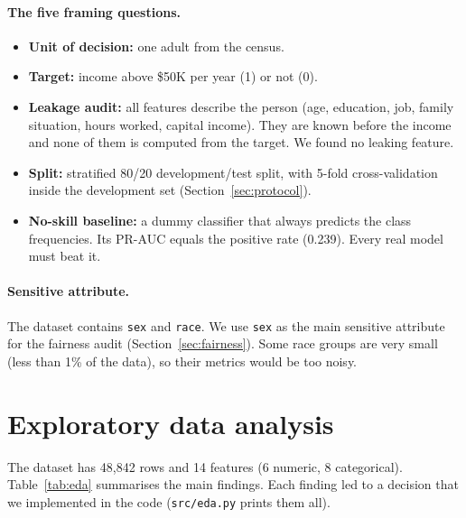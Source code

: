 \documentclass[11pt,a4paper]{article}
\begin{document}
\paragraph{The five framing questions.}
\begin{itemize}
  \item \textbf{Unit of decision:} one adult from the census.
  \item \textbf{Target:} income above \$50K per year (1) or not (0).
  \item \textbf{Leakage audit:} all features describe the person (age, education, job, family situation, hours worked, capital income). They are known before the income and none of them is computed from the target. We found no leaking feature.
  \item \textbf{Split:} stratified 80/20 development/test split, with 5-fold cross-validation inside the development set (Section~\ref{sec:protocol}).
  \item \textbf{No-skill baseline:} a dummy classifier that always predicts the class frequencies. Its PR-AUC equals the positive rate (0.239). Every real model must beat it.
\end{itemize}

\paragraph{Sensitive attribute.}
The dataset contains \texttt{sex} and \texttt{race}. We use \texttt{sex} as the main sensitive attribute for the fairness audit (Section~\ref{sec:fairness}). Some race groups are very small (less than 1\% of the data), so their metrics would be too noisy.

\section{Exploratory data analysis}
\label{sec:eda}

The dataset has 48{,}842 rows and 14 features (6 numeric, 8 categorical). Table~\ref{tab:eda} summarises the main findings. Each finding led to a decision that we implemented in the code (\texttt{src/eda.py} prints them all).
\end{document}
